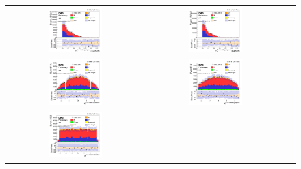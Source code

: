 \begin{figure}[ht]
  \begin{center}
    \begin{tabular}{ccc}
      \includegraphics[width=0.4\textwidth]{figures/tW/fig/Step2/ee/H_lepton_sub_pt.png}&
      \includegraphics[width=0.4\textwidth]{figures/tW/fig/Step2/mumu/H_lepton_sub_pt.png}\\
      \includegraphics[width=0.4\textwidth]{figures/tW/fig/Step2/ee/H_lepton_sub_eta.png}&
      \includegraphics[width=0.4\textwidth]{figures/tW/fig/Step2/mumu/H_lepton_sub_eta.png}\\
      \includegraphics[width=0.4\textwidth]{figures/tW/fig/Step2/ee/H_lepton_sub_phi.png}&

\end{tabular}
\end{center}
\end{figure}
